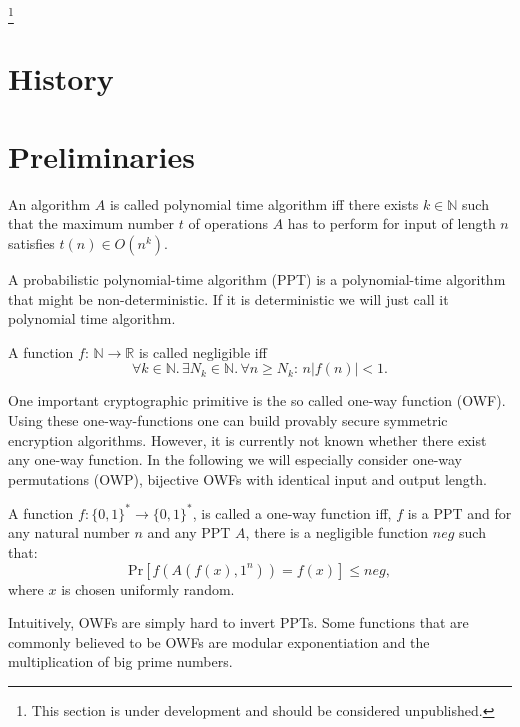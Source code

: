    \footnote{This section is under development and should be considered unpublished.}

\section{History}


\section{Preliminaries}

\begin{definition}
 An algorithm $A$ is called polynomial time algorithm iff there exists $k\in \mathbb{N}$ such that the maximum number $t$ of operations $A$ has to perform for input of length $n$ satisfies $t(n)\in O(n^k)$.
\end{definition}

\begin{definition}
 A probabilistic polynomial-time algorithm (PPT) is a polynomial-time algorithm that might be non-deterministic. If it is deterministic we will just call it polynomial time algorithm.
\end{definition}

\begin{definition}
 A function $f:\,\mathbb{N}\to\mathbb{R}$ is called negligible iff $$\forall k\in\mathbb{N}.\,\exists N_k\in\mathbb{N}.\,\forall n\geq N_k:\,n\left|f(n)\right|<1.$$
\end{definition}

One important cryptographic primitive is the so called one-way function (OWF). Using these one-way-functions one can build provably secure symmetric encryption algorithms. However, it is currently not known whether there exist any one-way function. In the following we will especially consider one-way permutations (OWP), bijective OWFs with identical input and output length. 

\begin{definition}
 A function $f:\{0,1\}^*\to \{0,1\}^*$, is called a one-way function iff, $f$ is a PPT and for any natural number $n$ and any PPT $A$, there is a negligible function $neg$ such that: $$\mathrm{Pr}\left[f(A(f(x),1^n))=f(x)\right]\leq neg,$$ where $x$ is chosen uniformly random.
\end{definition}
Intuitively, OWFs are simply hard to invert PPTs. Some functions that are commonly believed to be OWFs are modular exponentiation and the multiplication of big prime numbers. 

